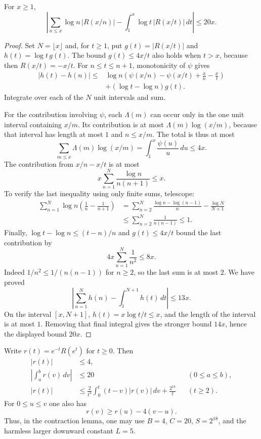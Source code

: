 \begin{lemma}
\label{sb:sum-integral}
For $x\ge1$,
\begin{equation}
 \left|\sum_{n\le x}\log n\,|R(x/n)|
            -\int_1^x\log t\,|R(x/t)|\,dt\right|\le20x.
 \label{sb:sum-integral-bound}
\end{equation}
\end{lemma}

\begin{proof}
Set $N=\lfloor x\rfloor$ and, for $t\ge1$, put
$g(t)=|R(x/t)|$ and $h(t)=\log t\,g(t)$.  The bound
$g(t)\le4x/t$ also holds when $t>x$, because then $R(x/t)=-x/t$.
For $n\le t\le n+1$, monotonicity of $\psi$ gives
\begin{align*}
 |h(t)-h(n)|
 \le{}&\log n\left(\psi(x/n)-\psi(x/t)+\frac xn-\frac xt\right)\\
      &+(\log t-\log n)g(t).
\end{align*}
Integrate over each of the $N$ unit intervals and sum.

For the contribution involving $\psi$, each $\Lambda(m)$ can occur
only in the one unit interval containing $x/m$.  Its contribution is
at most $\Lambda(m)\log(x/m)$, because that interval has length at
most $1$ and $n\le x/m$.  The total is thus at most
\[
 \sum_{m\le x}\Lambda(m)\log(x/m)
      =\int_1^x\frac{\psi(u)}u\,du\le4x.
\]
The contribution from $x/n-x/t$ is at most
\[
 x\sum_{n=1}^N\frac{\log n}{n(n+1)}\le x.
\]
To verify the last inequality using only finite sums, telescope:
\begin{align*}
 \sum_{n=1}^N\log n\left(\frac1n-\frac1{n+1}\right)
 &=\sum_{n=2}^N\frac{\log n-\log(n-1)}n
                         -\frac{\log N}{N+1}\\
 &\le\sum_{n=2}^N\frac1{n(n-1)}\le1.
\end{align*}
Finally, $\log t-\log n\le(t-n)/n$ and $g(t)\le4x/t$ bound the
last contribution by
\[
 4x\sum_{n=1}^N\frac1{n^2}\le8x.
\]
Indeed $1/n^2\le1/(n(n-1))$ for $n\ge2$, so the last sum is at
most $2$.  We have proved
\[
 \left|\sum_{n=1}^Nh(n)-\int_1^{N+1}h(t)\,dt\right|\le13x.
\]
On the interval $[x,N+1]$, $h(t)=x\log t/t\le x$, and the length
of the interval is at most $1$.  Removing that final integral gives
the stronger bound $14x$, hence the displayed bound $20x$.
\end{proof}

\begin{theorem}
\label{sb:contraction-inputs}
Write $r(t)=e^{-t}R(e^t)$ for $t\ge0$.  Then
\begin{align}
 |r(t)|&\le4,
 \label{sb:r-bound}\\
 \left|\int_a^b r(v)\,dv\right|&\le20
          &&(0\le a\le b),
 \label{sb:r-signed}\\
 |r(t)|&\le\frac2{t^2}\int_0^t(t-v)|r(v)|\,dv+\frac{2^{18}}t
          &&(t\ge2).
 \label{sb:r-weighted}
\end{align}
For $0\le u\le v$ one also has
\begin{equation}
 r(v)\ge r(u)-4(v-u).
 \label{sb:r-downward}
\end{equation}
Thus, in the contraction lemma, one may use
$B=4$, $C=20$, $S=2^{18}$, and the harmless larger downward constant
$L=5$.
\end{theorem}

